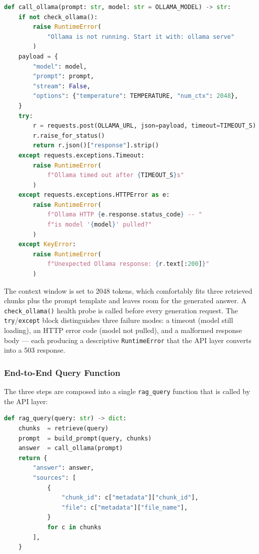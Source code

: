 \begin{lstlisting}[language=Python]
def call_ollama(prompt: str, model: str = OLLAMA_MODEL) -> str:
    if not check_ollama():
        raise RuntimeError(
            "Ollama is not running. Start it with: ollama serve"
        )
    payload = {
        "model": model,
        "prompt": prompt,
        "stream": False,
        "options": {"temperature": TEMPERATURE, "num_ctx": 2048},
    }
    try:
        r = requests.post(OLLAMA_URL, json=payload, timeout=TIMEOUT_S)
        r.raise_for_status()
        return r.json()["response"].strip()
    except requests.exceptions.Timeout:
        raise RuntimeError(
            f"Ollama timed out after {TIMEOUT_S}s"
        )
    except requests.exceptions.HTTPError as e:
        raise RuntimeError(
            f"Ollama HTTP {e.response.status_code} -- "
            f"is model '{model}' pulled?"
        )
    except KeyError:
        raise RuntimeError(
            f"Unexpected Ollama response: {r.text[:200]}"
        )
\end{lstlisting}

The context window is set to 2048 tokens, which comfortably fits three retrieved chunks plus the prompt template and leaves room for the generated answer. A \texttt{check\_ollama()} health probe is called before every generation request. The \texttt{try}/\texttt{except} block distinguishes three failure modes: a timeout (model still loading), an HTTP error code (model not pulled), and a malformed response body — each producing a descriptive \texttt{RuntimeError} that the API layer converts into a 503 response.

\subsubsection{End-to-End Query Function}

The three steps are composed into a single \texttt{rag\_query} function that is called by the API layer:

\begin{lstlisting}[language=Python]
def rag_query(query: str) -> dict:
    chunks  = retrieve(query)
    prompt  = build_prompt(query, chunks)
    answer  = call_ollama(prompt)
    return {
        "answer": answer,
        "sources": [
            {
                "chunk_id": c["metadata"]["chunk_id"],
                "file": c["metadata"]["file_name"],
            }
            for c in chunks
        ],
    }
\end{lstlisting}

